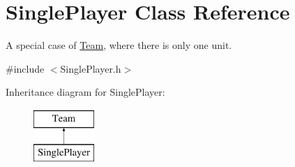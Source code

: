 \hypertarget{class_single_player}{}\section{Single\+Player Class Reference}
\label{class_single_player}


A special case of \hyperlink{class_team}{Team}, where there is only one unit.  




{\ttfamily \#include $<$Single\+Player.\+h$>$}

Inheritance diagram for Single\+Player\+:\begin{figure}[H]
\begin{center}
\leavevmode
\includegraphics[height=2.000000cm]{class_single_player}
\end{center}
\end{figure}
